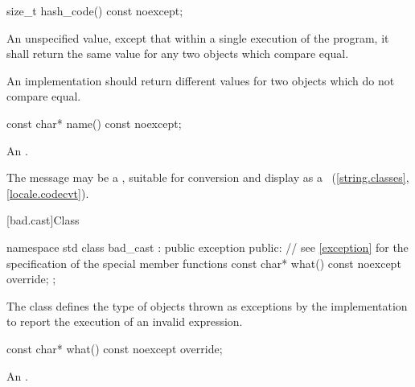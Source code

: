 %
\begin{itemdecl}
size_t hash_code() const noexcept;
\end{itemdecl}

\begin{itemdescr}
\pnum
\returns
An unspecified value, except that within a single execution of the
program, it shall return the same value for any two 
objects which compare equal.

\pnum
\remarks
An implementation should return different values for two
 objects which do not compare equal.
\end{itemdescr}


%
\begin{itemdecl}
const char* name() const noexcept;
\end{itemdecl}

\begin{itemdescr}
\pnum
\returns
An  \ntbs{}.

\pnum
\remarks
The message may be a
,
suitable for conversion and display as a
~(\ref{string.classes}, \ref{locale.codecvt}).
\end{itemdescr}

[bad.cast]{Class }

%
%
\begin{codeblock}
namespace std {
  class bad_cast : public exception {
  public:
    // see \ref{exception} for the specification of the special member functions
    const char* what() const noexcept override;
  };
}
\end{codeblock}

\pnum
The class
defines the type of objects thrown
as exceptions by the implementation to report the execution of an invalid
%
expression.

%
\begin{itemdecl}
const char* what() const noexcept override;
\end{itemdecl}

\begin{itemdescr}
\pnum
\returns
An  \ntbs{}.
\end{itemdescr}

